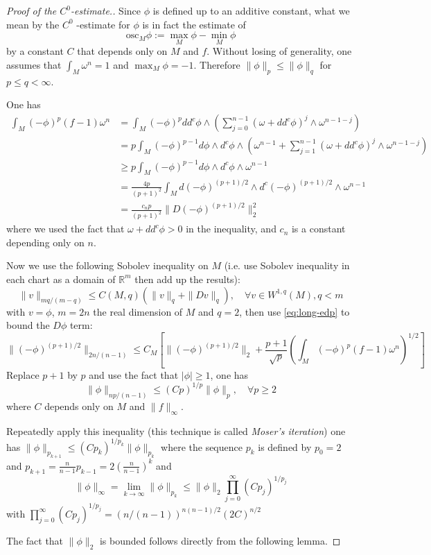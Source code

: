 \documentclass[11pt]{article}
\begin{document}
\begin{proof}[Proof of the $C^0$-estimate.]
Since \(\phi\) is defined up to an additive constant, what we mean by the \(C^0\) -estimate for \(\phi\) is in
fact the estimate of
\[
\text{osc}_M \phi := \max_M \phi - \min_M \phi
\]
by a constant \(C\) that depends only on \(M\) and \(f\). Without losing of generality, one assumes that
\(\int_M \omega^n = 1\) and  \(\max_M \phi = -1\). Therefore \(\| \phi \|_p \leq \| \phi\|_q\) for \(p\leq
q<\infty\).  

One has
\begin{align}
\int_M (-\phi)^p (f-1)\omega^n &= \int_M (-\phi)^p dd^c\phi \wedge \left( \sum_{j=0}^{n-1} (\omega +
dd^c\phi)^j\wedge \omega^{n-1-j}\right) \\
 &= p \int_M (-\phi)^{p-1} d\phi \wedge d^c\phi \wedge \left( \omega^{n-1} + \sum_{j=1}^{n-1}(\omega +
dd^c\phi)^j\wedge \omega^{n-1-j}  \right)\\
&\geq p\int_M (-\phi)^{p-1}d\phi\wedge d^c\phi\wedge \omega^{n-1}\\
&=\frac{4p}{(p+1)^2}\int_M d(-\phi)^{(p+1)/2}\wedge d^c(-\phi)^{(p+1)/2}\wedge \omega^{n-1}\\
&=\frac{c_n p}{(p+1)^2}\| D(-\phi)^{(p+1)/2}\|_2^2
\label{eq:long-edp}
\end{align}
where we used the fact that \(\omega + dd^c\phi >0\) in the inequality, and \(c_n\) is a constant depending only on \(n\).

Now we use the following Sobolev inequality on \(M\) (i.e. use Sobolev inequality in each chart as a
domain of \(\mathbb{R}^m\) then add up the results):
\[
\|v \|_{mq/(m-q)} \leq C(M,q) (\| v\|_q + \|Dv\|_q),\quad \forall v\in W^{1,q}(M), q<m
\]
with \(v = \phi\), \(m=2n\) the real dimension of \(M\) and \(q=2\), then use \eqref{eq:long-edp} to bound
the \(D\phi\) term:
\[
\| (-\phi)^{(p+1)/2}\|_{2n/(n-1)} \leq C_M \left[ \|(-\phi)^{(p+1)/2}\|_2 +
\frac{p+1}{\sqrt{p}}\left(\int_M (-\phi)^p (f-1) \omega^n\right)^{1/2} 
\right]
\]
Replace \(p+1\) by \(p\) and use the fact that \(|\phi|\geq 1\), one has
\[
\|\phi \|_{np/(n-1)} \leq (Cp)^{1/p} \|\phi\|_p,\quad \forall p\geq 2
\]
where \(C\) depends only on \(M\) and \(\|f\|_{\infty}\). 

Repeatedly apply this inequality (this technique is called \emph{Moser's iteration}) one has \(\|\phi
\|_{p_{k+1}} \leq (Cp_k)^{1/p_k} \|\phi\|_{p_k}\) where the sequence \(p_k\) is defined by \(p_0 = 2\)
and \(p_{k+1} = \frac{n}{n-1}p_{k-1} = 2(\frac{n}{n-1})^k\) and \[ \|\phi\|_{\infty} =
\lim_{k\to\infty}\|\phi\|_{p_k} \leq \|\phi\|_2 \prod_{j=0}^\infty (Cp_j)^{1/p_j} \] with
\(\prod_{j=0}^\infty (Cp_j)^{1/p_j} = (n/(n-1))^{n(n-1)/2} (2C)^{n/2}\)

The fact that \(\|\phi\|_2\) is bounded follows directly from the following lemma. 
\end{proof}
\end{document}
